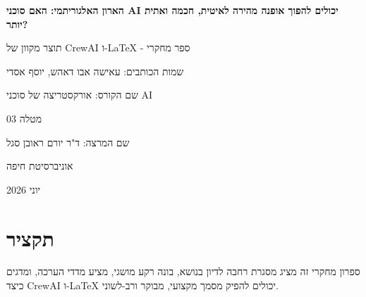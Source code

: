 \documentclass[12pt,a4paper,openany]{book}
\begin{document}
\thispagestyle{empty}
\begin{center}
\vspace*{3.5cm}
{\Huge\bfseries הארון האלגוריתמי: האם סוכני AI יכולים להפוך אופנה מהירה לאיטית, חכמה ואתית יותר?\par}
\vspace{0.7cm}
{\Large תוצר מקוון של CrewAI ו-LaTeX - ספר מחקרי\par}
\vspace{1.4cm}
{\Large שמות הכותבים: עאישה אבו דאהש, יוסף אסדי\par}
\vspace{0.5cm}
{\large שם הקורס: אורקסטריצה של סוכני AI\par}
{\large מטלה 03\par}
{\large שם המרצה: ד"ר יורם ראובן סגל\par}
\vfill
{\large אוניברסיטת חיפה\par}
{\large יוני 2026\par}
\end{center}
\clearpage
\chapter*{תקציר}
ספרון מחקרי זה מציג מסגרת רחבה לדיון בנושא, בונה רקע מושגי, מציע מדדי הערכה, ומדגים כיצד CrewAI ו-LaTeX יכולים להפיק מסמך מקצועי, מבוקר ורב-לשוני.
\end{document}
